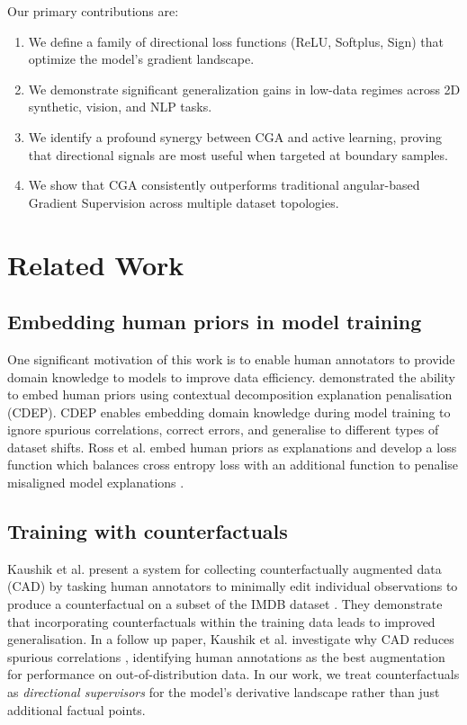 \documentclass[sigconf,anonymous]{aamas}
\begin{document}
Our primary contributions are:
\begin{enumerate}
    \item We define a family of directional loss functions (ReLU, Softplus, Sign) that optimize the model's gradient landscape.
    \item We demonstrate significant generalization gains in low-data regimes across 2D synthetic, vision, and NLP tasks.
    \item We identify a profound synergy between CGA and active learning, proving that directional signals are most useful when targeted at boundary samples.
    \item We show that CGA consistently outperforms traditional angular-based Gradient Supervision across multiple dataset topologies.
\end{enumerate}

\section{Related Work}
\label{related_work}

\subsection{Embedding human priors in model training}
One significant motivation of this work is to enable human annotators to provide domain knowledge to models to improve data efficiency. \citeauthor{rieger2020interpretations} \cite{rieger2020interpretations} demonstrated the ability to embed human priors using contextual decomposition explanation penalisation (CDEP). CDEP enables embedding domain knowledge during model training to ignore spurious correlations, correct errors, and generalise to different types of dataset shifts. Ross et al. embed human priors as explanations and develop a loss function which balances cross entropy loss with an additional function to penalise misaligned model explanations \cite{ross2017right}.

\subsection{Training with counterfactuals}
Kaushik et al. \cite{Kaushik2020Learning} present a system for collecting counterfactually augmented data (CAD) by tasking human annotators to minimally edit individual observations to produce a counterfactual on a subset of the IMDB dataset \cite{imdb}. They demonstrate that incorporating counterfactuals within the training data leads to improved generalisation. In a follow up paper, Kaushik et al. investigate why CAD reduces spurious correlations \cite{kaushik2021explaining}, identifying human annotations as the best augmentation for performance on out-of-distribution data. In our work, we treat counterfactuals as \emph{directional supervisors} for the model's derivative landscape rather than just additional factual points.
\end{document}
